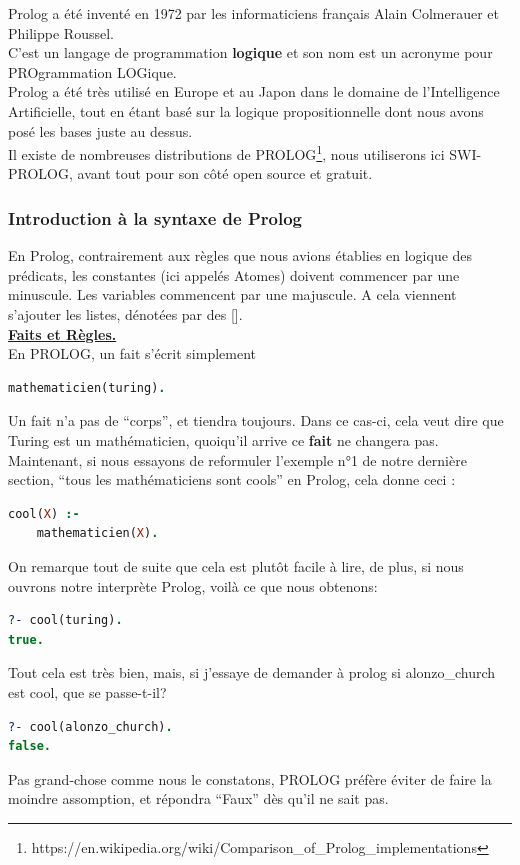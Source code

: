 \documentclass[a4paper, 12pt]{article}
\numberwithin{equation}{subsection}
\begin{document}
Prolog a été inventé en 1972 par les informaticiens français Alain Colmerauer et Philippe Roussel. \\

C'est un langage de programmation {\bf logique} et son nom est un acronyme pour PROgrammation LOGique. \\

Prolog a été très utilisé en Europe et au Japon dans le domaine de l'Intelligence Artificielle, tout en étant basé sur la logique propositionnelle dont nous avons posé les bases juste au dessus. \\

Il existe de nombreuses distributions de PROLOG\footnote{https://en.wikipedia.org/wiki/Comparison\_of\_Prolog\_implementations}, nous utiliserons ici SWI-PROLOG, avant tout pour son côté open source et gratuit.
\subsubsection{Introduction à la syntaxe de Prolog}
En Prolog, contrairement aux règles que nous avions établies en logique des prédicats, les constantes (ici appelés Atomes) doivent commencer par une minuscule. Les variables commencent par une majuscule. A cela viennent s'ajouter les listes, dénotées par des []. \\

\underline{{\bf Faits et Règles.}} \\[0.2cm]
En PROLOG, un fait s'écrit simplement \\
\begin{lstlisting}[language=Prolog]
mathematicien(turing).
\end{lstlisting}
Un fait n'a pas de ``corps'', et tiendra toujours. Dans ce cas-ci, cela veut dire que Turing est un mathématicien, quoiqu'il arrive ce {\bf fait} ne changera pas. \\

Maintenant, si nous essayons de reformuler l'exemple n°1 de notre dernière section, ``tous les mathématiciens sont cools'' en Prolog, cela donne ceci :
\begin{lstlisting}[language=Prolog]
cool(X) :-
    mathematicien(X).
\end{lstlisting}
On remarque tout de suite que cela est plutôt facile à lire, de plus, si nous ouvrons notre interprète Prolog, voilà ce que nous obtenons:
\begin{lstlisting}[language=Prolog]
?- cool(turing).
true.
\end{lstlisting}
Tout cela est très bien, mais, si j'essaye de demander à prolog si alonzo\_church est cool, que se passe-t-il?
\begin{lstlisting}[language=Prolog]
?- cool(alonzo_church).
false.
\end{lstlisting}
Pas grand-chose comme nous le constatons, PROLOG préfère éviter de faire la moindre assomption, et répondra ``Faux'' dès qu'il ne sait pas.\\
\end{document}
